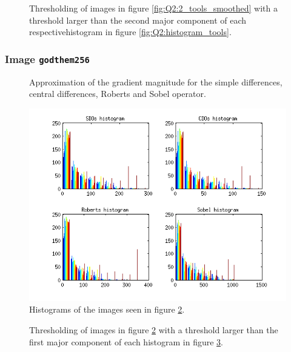 \begin{figure}[H]
	\centering
	\scalebox{0.9}{}
	\caption{Thresholding of images in figure \ref{fig:Q2:2_tools_smoothed} with
    a threshold larger than the second major component of
    each respectivehistogram in figure \ref{fig:Q2:histogram_tools}.}
	\label{fig:Q2:threshold_tools_smoothed_2}
\end{figure}




\subsubsection{Image \texttt{godthem256}}

\begin{figure}[H]
	\centering
	\scalebox{0.7}{}
	\caption{Approximation of the gradient magnitude for the simple differences, central differences, Roberts and Sobel operator.}
	\label{fig:Q2:2_house}
\end{figure}

\begin{figure}[H]
	\centering
	\includegraphics[scale=0.8]{./images/Q2/house/histogram_2.png}
	\caption{Histograms of the images seen in figure \ref{fig:Q2:2_house}.}
	\label{fig:Q2:histogram_house}
\end{figure}


\begin{figure}[H]
	\centering
	\scalebox{0.9}{}
	\caption{Thresholding of images in figure \ref{fig:Q2:2_house} with a threshold larger than the first major component of
	each histogram in figure \ref{fig:Q2:histogram_house}.}
	\label{fig:Q2:threshold_house_1}
\end{figure}

